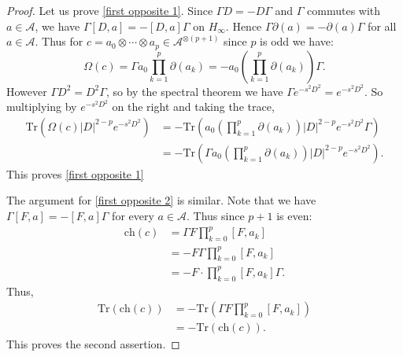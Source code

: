     \begin{proof}
        Let us prove \eqref{first opposite 1}. Since $\Gamma D = -D\Gamma$ and $\Gamma$ commutes with $a \in \mathcal{A}$, we have $\Gamma [D,a]=-[D,a]\Gamma$ on $H_\infty$. Hence $\Gamma \partial(a) = -\partial(a)\Gamma$
        for all $a \in \mathcal{A}$.
        Thus for $c = a_0\otimes \cdots\otimes a_p \in \mathcal{A}^{\otimes (p+1)}$ since $p$ is odd we have:
        $$\Omega(c)=\Gamma a_0\prod_{k=1}^p\partial(a_k)=-a_0\left(\prod_{k=1}^p\partial(a_k)\right)\Gamma.$$
        However $\Gamma D^2 = D^2\Gamma$, so by the spectral theorem we have $\Gamma e^{-s^2D^2} = e^{-s^2D^2}$. So multiplying by $e^{-s^2D^2}$ on the right and taking the trace,
        \begin{align*}
        \mathrm{Tr}(\Omega(c)|D|^{2-p}e^{-s^2D^2}) &= -\mathrm{Tr}(a_0\left(\prod_{k=1}^p\partial(a_k)\right)|D|^{2-p}e^{-s^2D^2}\Gamma)\\
                                           &= -\mathrm{Tr}(\Gamma a_0\left(\prod_{k=1}^p\partial(a_k)\right)|D|^{2-p}e^{-s^2D^2}).
        \end{align*}
        This proves \eqref{first opposite 1}

        The argument for \eqref{first opposite 2} is similar. Note that we have $\Gamma[F,a]=-[F,a]\Gamma$ for every $a\in\mathcal{A}.$ Thus since $p+1$ is even:
        \begin{align*}
            \mathrm{ch}(c) &= \Gamma F\prod_{k=0}^p[F,a_k]\\
                   &= -F\Gamma \prod_{k=0}^p[F,a_k]\\
                   &= -F\cdot\prod_{k=0}^p[F,a_k]\Gamma.
        \end{align*}
        Thus,
        \begin{align*}
            \mathrm{Tr}(\mathrm{ch}(c)) &= -\mathrm{Tr}(\Gamma F\prod_{k=0}^p[F,a_k])\\
                        &= -\mathrm{Tr}(\mathrm{ch}(c)).
        \end{align*}
        This proves the second assertion.
    \end{proof}
    

